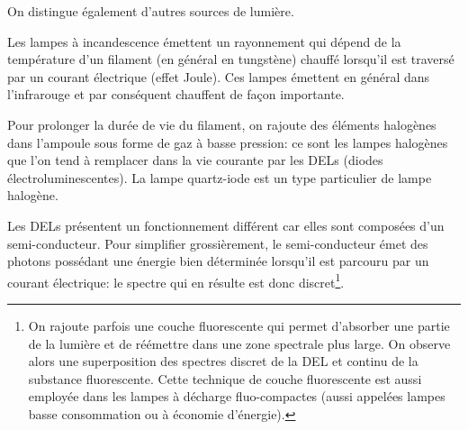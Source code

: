 \documentclass[12pt,fancy]{cours}
\begin{document}
\begin{remarque}
On distingue également d’autres sources de lumière.
\begin{liste}
\item Les lampes à incandescence émettent un rayonnement qui dépend de la température d'un filament (en général en tungstène) chauffé lorsqu'il est traversé par un courant électrique (effet Joule). Ces lampes émettent en général dans l'infrarouge et par conséquent chauffent de façon importante.
\item Pour prolonger la durée de vie du filament, on rajoute des éléments halogènes dans l'ampoule sous forme de gaz à basse pression: ce sont les lampes halogènes que l'on tend à remplacer dans la vie courante par les DELs (diodes électroluminescentes). La lampe quartz-iode est un type particulier de lampe halogène.
\item  Les DELs présentent un fonctionnement différent car elles sont composées d'un semi-conducteur. Pour simplifier grossièrement, le semi-conducteur émet des photons possédant une énergie bien déterminée lorsqu'il est parcouru par un courant électrique: le spectre qui en résulte est donc discret\footnote{On rajoute parfois une couche fluorescente qui permet d'absorber une partie de la lumière et de réémettre dans une zone spectrale plus large. On observe alors une superposition des spectres discret de la DEL et continu de la substance fluorescente. Cette technique de couche fluorescente est aussi employée dans les lampes à décharge fluo-compactes (aussi appelées lampes basse consommation ou à économie d'énergie).}.
\end{liste}
\end{remarque}
\end{document}
